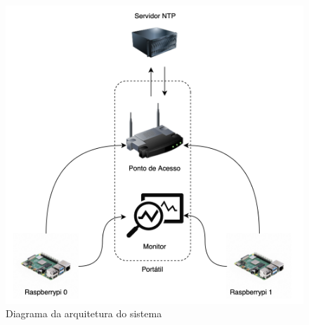     \begin{figure}[h]
        \centering
        \includegraphics[width=0.8\linewidth]{figures/diagramaSistema.png}
        \caption{Diagrama da arquitetura do sistema \cite{b1}}
        \label{fig:diagramaSistema}
    \end{figure}


    